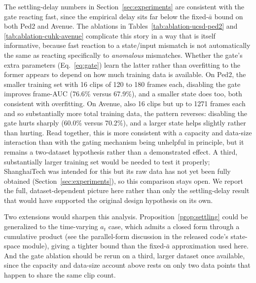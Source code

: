 The settling-delay numbers in Section~\ref{sec:experiments} are consistent with the gate reacting fast, since the empirical delay sits far below the fixed-$\bar a$ bound on both Ped2 and Avenue. The ablations in Tables~\ref{tab:ablation-ucsd-ped2} and \ref{tab:ablation-cuhk-avenue} complicate this story in a way that is itself informative, because fast reaction to a state/input mismatch is not automatically the same as reacting specifically to \emph{anomalous} mismatches. Whether the gate's extra parameters (Eq.~\ref{eq:gate}) learn the latter rather than overfitting to the former appears to depend on how much training data is available. On Ped2, the smaller training set with 16 clips of 120 to 180 frames each, disabling the gate improves frame-AUC (76.6\% versus 67.9\%), and a smaller state does too, both consistent with overfitting. On Avenue, also 16 clips but up to 1271 frames each and so substantially more total training data, the pattern reverses: disabling the gate hurts sharply (60.0\% versus 70.2\%), and a larger state helps slightly rather than hurting. Read together, this is more consistent with a capacity and data-size interaction than with the gating mechanism being unhelpful in principle, but it remains a two-dataset hypothesis rather than a demonstrated effect. A third, substantially larger training set would be needed to test it properly; ShanghaiTech was intended for this but its raw data has not yet been fully obtained (Section~\ref{sec:experiments}), so this comparison stays open. We report the full, dataset-dependent picture here rather than only the settling-delay result that would have supported the original design hypothesis on its own.

Two extensions would sharpen this analysis. Proposition~\ref{prop:settling} could be generalized to the time-varying $a_t$ case, which admits a closed form through a cumulative product (see the parallel-form discussion in the released code's state-space module), giving a tighter bound than the fixed-$\bar a$ approximation used here. And the gate ablation should be rerun on a third, larger dataset once available, since the capacity and data-size account above rests on only two data points that happen to share the same clip count.
